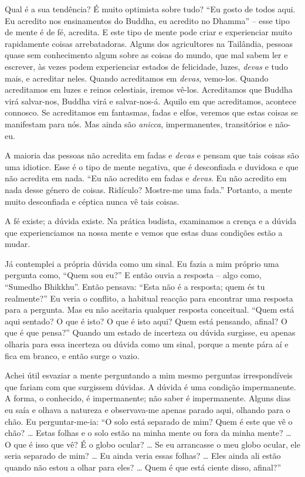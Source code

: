 Qual é a sua tendência? É muito optimista sobre tudo? ``Eu gosto de todos aqui.
Eu acredito nos ensinamentos do Buddha, eu acredito no Dhamma'' -- esse tipo de
mente é de fé, acredita. E este tipo de mente pode criar e experienciar muito
rapidamente coisas arrebatadoras. Alguns dos agricultores na Tailândia, pessoas
quase sem conhecimento algum sobre as coisas do mundo, que mal sabem ler e
escrever, às vezes podem experienciar estados de felicidade, luzes, \emph{devas}
e tudo mais, e acreditar neles. Quando acreditamos em \emph{devas}, vemo-los.
Quando acreditamos em luzes e reinos celestiais, iremos vê-los. Acreditamos que
Buddha virá salvar-nos, Buddha virá e salvar-nos-á. Aquilo em que acreditamos,
acontece connosco. Se acreditamos em fantasmas, fadas e elfos, veremos que estas
coisas se manifestam para nós. Mas ainda são \emph{anicca}, impermanentes,
transitórios e não-eu.

A maioria das pessoas não acredita em fadas e \emph{devas} e pensam que tais
coisas são uma idiotice. Esse é o tipo de mente negativa, que é desconfiada e
duvidosa e que não acredita em nada. ``Eu não acredito em fadas e \emph{devas}.
Eu não acredito em nada desse género de coisas. Ridículo? Mostre-me uma fada.''
Portanto, a mente muito desconfiada e céptica nunca vê tais coisas.

A fé existe; a dúvida existe. Na prática budista, examinamos a crença e a dúvida
que experienciamos na nossa mente e vemos que estas duas condições estão a
mudar.

Já contemplei a própria dúvida como um sinal. Eu fazia a mim próprio uma
pergunta como, ``Quem sou eu?'' E então ouvia a resposta -- algo como, ``Sumedho
Bhikkhu''. Então pensava: ``Esta não é a resposta; quem és tu realmente?'' Eu
veria o conflito, a habitual reacção para encontrar uma resposta para a
pergunta. Mas eu não aceitaria qualquer resposta conceitual. ``Quem está aqui
sentado? O que é isto? O que é isto aqui? Quem está pensando, afinal? O que é
que pensa?'' Quando um estado de incerteza ou dúvida surgisse, eu apenas olharia
para essa incerteza ou dúvida como um sinal, porque a mente pára aí e fica em
branco, e então surge o vazio.

Achei útil esvaziar a mente perguntando a mim mesmo perguntas irrespondíveis que
fariam com que surgissem dúvidas. A dúvida é uma condição impermanente. A forma,
o conhecido, é impermanente; não saber é impermanente. Alguns dias eu saía e
olhava a natureza e observava-me apenas parado aqui, olhando para o chão. Eu
perguntar-me-ia: ``O solo está separado de mim? Quem é este que vê o chão? \ldots{}
Estas folhas e o solo estão na minha mente ou fora da minha mente? \ldots{} O que é
isso que vê? É o globo ocular? \ldots{} Se eu arrancasse o meu globo ocular, ele
seria separado de mim? \ldots{} Eu ainda veria essas folhas? \ldots{} Eles ainda ali estão
quando não estou a olhar para eles? \ldots{} Quem é que está ciente disso, afinal?''

